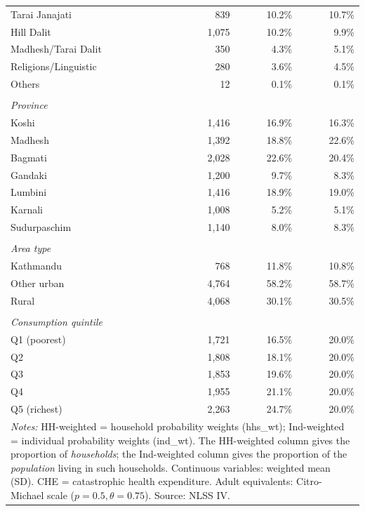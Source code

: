 \begin{table}[htbp]
\begin{tabular}{lrrr}
\quad Tarai Janajati & 839 & 10.2\% & 10.7\% \\
\quad Hill Dalit & 1,075 & 10.2\% & 9.9\% \\
\quad Madhesh/Tarai Dalit & 350 & 4.3\% & 5.1\% \\
\quad Religions/Linguistic & 280 & 3.6\% & 4.5\% \\
\quad Others & 12 & 0.1\% & 0.1\% \\
\\
\multicolumn{4}{l}{\textit{Province}} \\
\quad Koshi & 1,416 & 16.9\% & 16.3\% \\
\quad Madhesh & 1,392 & 18.8\% & 22.6\% \\
\quad Bagmati & 2,028 & 22.6\% & 20.4\% \\
\quad Gandaki & 1,200 & 9.7\% & 8.3\% \\
\quad Lumbini & 1,416 & 18.9\% & 19.0\% \\
\quad Karnali & 1,008 & 5.2\% & 5.1\% \\
\quad Sudurpaschim & 1,140 & 8.0\% & 8.3\% \\
\\
\multicolumn{4}{l}{\textit{Area type}} \\
\quad Kathmandu & 768 & 11.8\% & 10.8\% \\
\quad Other urban & 4,764 & 58.2\% & 58.7\% \\
\quad Rural & 4,068 & 30.1\% & 30.5\% \\
\\
\multicolumn{4}{l}{\textit{Consumption quintile}} \\
\quad Q1 (poorest) & 1,721 & 16.5\% & 20.0\% \\
\quad Q2 & 1,808 & 18.1\% & 20.0\% \\
\quad Q3 & 1,853 & 19.6\% & 20.0\% \\
\quad Q4 & 1,955 & 21.1\% & 20.0\% \\
\quad Q5 (richest) & 2,263 & 24.7\% & 20.0\% \\
\hline\hline
\multicolumn{4}{p{13cm}}{\footnotesize \textit{Notes:} HH-weighted = household probability weights (hhs\_wt); Ind-weighted = individual probability weights (ind\_wt). The HH-weighted column gives the proportion of \textit{households}; the Ind-weighted column gives the proportion of the \textit{population} living in such households. Continuous variables: weighted mean (SD). CHE = catastrophic health expenditure. Adult equivalents: Citro-Michael scale ($p=0.5, \theta=0.75$). Source: NLSS IV.} \\
\end{tabular}
\end{table}

